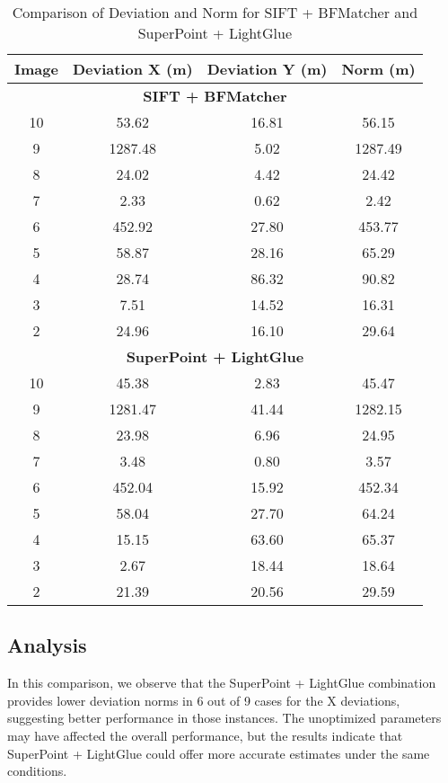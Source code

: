 \begin{table}[H]
    \centering
    \begin{tabular}{|c|c|c|c|}
        \hline
        \textbf{Image} & \textbf{Deviation X (m)} & \textbf{Deviation Y (m)} & \textbf{Norm (m)} \\
        \hline
        \multicolumn{4}{|c|}{\textbf{SIFT + BFMatcher}} \\
        \hline
        10 & 53.62 & 16.81 & 56.15 \\
        9 & 1287.48 & 5.02 & 1287.49 \\
        8 & 24.02 & 4.42 & 24.42 \\
        7 & 2.33 & 0.62 & 2.42 \\
        6 & 452.92 & 27.80 & 453.77 \\
        5 & 58.87 & 28.16 & 65.29 \\
        4 & 28.74 & 86.32 & 90.82 \\
        3 & 7.51 & 14.52 & 16.31 \\
        2 & 24.96 & 16.10 & 29.64 \\
        \hline
        \multicolumn{4}{|c|}{\textbf{SuperPoint + LightGlue}} \\
        \hline
        10 & 45.38 & 2.83 & 45.47 \\
        9 & 1281.47 & 41.44 & 1282.15 \\
        8 & 23.98 & 6.96 & 24.95 \\
        7 & 3.48 & 0.80 & 3.57 \\
        6 & 452.04 & 15.92 & 452.34 \\
        5 & 58.04 & 27.70 & 64.24 \\
        4 & 15.15 & 63.60 & 65.37 \\
        3 & 2.67 & 18.44 & 18.64 \\
        2 & 21.39 & 20.56 & 29.59 \\
        \hline
    \end{tabular}
    \caption{Comparison of Deviation and Norm for SIFT + BFMatcher and SuperPoint + LightGlue}
    \label{tab:comparison}
\end{table}

\subsection*{Analysis}
In this comparison, we observe that the SuperPoint + LightGlue combination provides lower deviation norms in 6 out of 9 cases for the X deviations, suggesting better performance in those instances. The unoptimized parameters may have affected the overall performance, but the results indicate that SuperPoint + LightGlue could offer more accurate estimates under the same conditions.


